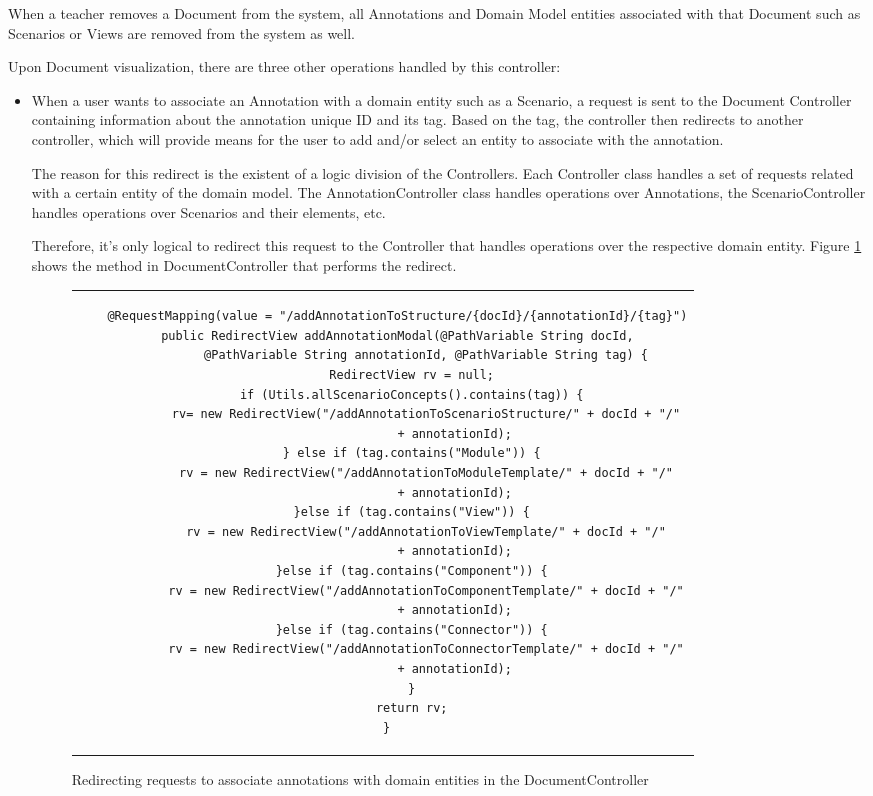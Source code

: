 When a teacher removes a Document from the system, all Annotations and Domain Model entities associated with that Document such as Scenarios or Views are removed from the system as well.

Upon Document visualization, there are three other operations handled by this controller:

\begin{itemize}
\item When a user wants to associate an Annotation with a domain entity such as a Scenario, a request is sent to the Document Controller containing information about the annotation unique ID and its tag. Based on the tag, the controller then redirects to another controller, which will provide means for the user to add and/or select an entity to associate with the annotation.

The reason for this redirect is the existent of a logic division of the Controllers. Each Controller class handles a set of requests related with a certain entity of the domain model. The AnnotationController class handles operations over Annotations, the ScenarioController handles operations over Scenarios and their elements, etc. 

Therefore, it's only logical to redirect this request to the Controller that handles operations over the respective domain entity. Figure \ref{figure:documentControllerLinkAnnotation} shows the method in DocumentController that performs the redirect.

\begin{figure}[h]
\centering
\lstset{style=customjava}
\begin{tabular}{c}
\begin{lstlisting}
	@RequestMapping(value = "/addAnnotationToStructure/{docId}/{annotationId}/{tag}")
	public RedirectView addAnnotationModal(@PathVariable String docId,
			@PathVariable String annotationId, @PathVariable String tag) {
		RedirectView rv = null;
		if (Utils.allScenarioConcepts().contains(tag)) {
			rv= new RedirectView("/addAnnotationToScenarioStructure/" + docId + "/"
					+ annotationId);
		} else if (tag.contains("Module")) {
			rv = new RedirectView("/addAnnotationToModuleTemplate/" + docId + "/"
					+ annotationId);
		}else if (tag.contains("View")) {
			rv = new RedirectView("/addAnnotationToViewTemplate/" + docId + "/"
					+ annotationId);
		}else if (tag.contains("Component")) {
			rv = new RedirectView("/addAnnotationToComponentTemplate/" + docId + "/"
					+ annotationId);
		}else if (tag.contains("Connector")) {
			rv = new RedirectView("/addAnnotationToConnectorTemplate/" + docId + "/"
					+ annotationId);
		}
		return rv;
	}	
\end{lstlisting}
\end{tabular}
\caption{Redirecting requests to associate annotations with domain entities in the DocumentController}
\label{figure:documentControllerLinkAnnotation}
\end{figure}


\end{itemize}
